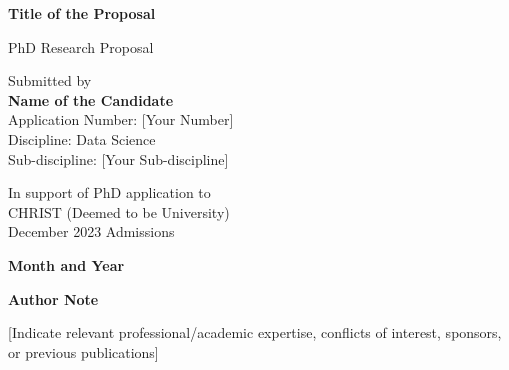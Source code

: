 \documentclass[12pt]{article}
\begin{document}
\begin{titlepage}
    \centering
    \vspace*{2cm}
    {\LARGE\textbf{Title of the Proposal}\par}
    \vspace{1cm}
    {\Large PhD Research Proposal\par}
    \vspace{2cm}
    
    Submitted by \\
    \textbf{Name of the Candidate} \\
    Application Number: [Your Number] \\
    Discipline: Data Science \\
    Sub-discipline: [Your Sub-discipline] \\
    \vspace{1cm}
    
    In support of PhD application to \\
    CHRIST (Deemed to be University) \\
    December 2023 Admissions \\
    \vspace{2cm}
    
    \textbf{Month and Year} \\
    \vfill
    \raggedright%
    \textbf{Author Note}

    [Indicate relevant professional/academic expertise, conflicts of interest, sponsors, or previous publications]
\end{titlepage}

\newpage


\newpage
{}
\setcounter{page}{1}














\newpage
\printbibliography[title=References]
\end{document}
